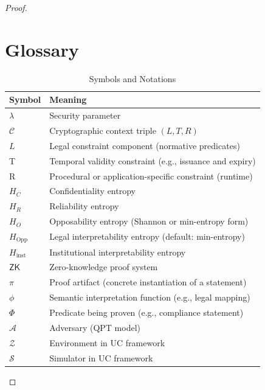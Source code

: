 \documentclass[preprint,12pt]{elsarticle}
\begin{document}
\begin{proof}
        \section{Glossary}\label{app:Appendix_D}
            \begin{table}[H]
                \centering
                \caption{Symbols and Notations}
                \label{tab:notation}
                \renewcommand{\arraystretch}{1.2}
                \begin{tabular}{@{}ll@{}}
                    \toprule
                    \textbf{Symbol} & \textbf{Meaning} \\
                    \midrule
                    $\lambda$ & Security parameter \\
                    $\mathcal{C}$ & Cryptographic context triple $(L, T, R)$ \\
                    $L$ & Legal constraint component (normative predicates) \\
                    T & Temporal validity constraint (e.g., issuance and expiry) \\
                    R & Procedural or application-specific constraint (runtime) \\
                    $H_C$ & Confidentiality entropy \\
                    $H_R$ & Reliability entropy \\
                    $H_O$ & Opposability entropy (Shannon or min-entropy form) \\
                    $H_{\text{Opp}}$ & Legal interpretability entropy (default: min-entropy) \\
                    $H_{\text{inst}}$ & Institutional interpretability entropy \\
                    $\mathsf{ZK}$ & Zero-knowledge proof system \\
                    $\pi$ & Proof artifact (concrete instantiation of a statement) \\
                    $\phi$ & Semantic interpretation function (e.g., legal mapping) \\
                    $\Phi$ & Predicate being proven (e.g., compliance statement) \\
                    $\mathcal{A}$ & Adversary (QPT model) \\
                    $\mathcal{Z}$ & Environment in UC framework \\
                    $\mathcal{S}$ & Simulator in UC framework \\

\end{tabular}
\end{table}
\end{proof}
\end{document}
